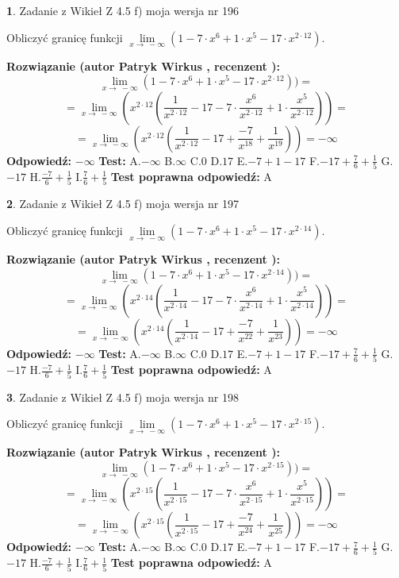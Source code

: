 \documentclass[12pt, a4paper]{article}
\theoremstyle{definition} %
\newtheorem{zad}{}
\newcommand{\zadStart}[1]{\begin{zad}#1\newline}
\newcommand{\zadStop}{\end{zad}}
\newcommand{\rozwStart}[2]{\noindent \textbf{Rozwiązanie (autor #1 , recenzent #2): }\newline}
\newcommand{\rozwStop}{\newline}
\newcommand{\odpStart}{\noindent \textbf{Odpowiedź:}\newline}
\newcommand{\odpStop}{\newline}
\newcommand{\testStart}{\noindent \textbf{Test:}\newline}
\newcommand{\testStop}{\newline}
\newcommand{\kluczStart}{\noindent \textbf{Test poprawna odpowiedź:}\newline}
\newcommand{\kluczStop}{\newline}
\begin{document}
\zadStart{Zadanie z Wikieł Z 4.5 f) moja wersja nr 196}



Obliczyć granicę funkcji  $\lim\limits_{x\to\ -\infty}(1 - 7 \cdot x^{6}+1 \cdot x^{5}- 17 \cdot x^{2\cdot12})$.
\zadStop
\rozwStart{Patryk Wirkus}{}
$$\lim\limits_{x\to\ -\infty}(1 - 7 \cdot x^{6}+1 \cdot x^{5}- 17 \cdot x^{2\cdot12}))=$$
$$=\lim\limits_{x\to\ -\infty}(x^{2\cdot12}(\frac{1}{x^{2\cdot12}}-17 -7 \cdot \frac{x^{6}}{x^{2\cdot12}}+1 \cdot \frac{x^{5}}{x^{2\cdot12}}))=$$
$$=\lim\limits_{x\to\ -\infty}(x^{2\cdot12}(\frac{1}{x^{2\cdot12}}-17 + \frac{-7}{x^{18}}+ \frac{1}{x^{19}}))=-\infty$$
\rozwStop
\odpStart
$-\infty$
\odpStop
\testStart
A.$-\infty$ B.$\infty$ C.$0$ D.$17$ E.$-7 + 1 - 17$
F.$-17+\frac{7}{6}+\frac{1}{5}$ G.$-17$
H.$\frac{-7}{6}+\frac{1}{5}$
I.$\frac{7}{6}+\frac{1}{5}$
\testStop
\kluczStart
A
\kluczStop



\zadStart{Zadanie z Wikieł Z 4.5 f) moja wersja nr 197}



Obliczyć granicę funkcji  $\lim\limits_{x\to\ -\infty}(1 - 7 \cdot x^{6}+1 \cdot x^{5}- 17 \cdot x^{2\cdot14})$.
\zadStop
\rozwStart{Patryk Wirkus}{}
$$\lim\limits_{x\to\ -\infty}(1 - 7 \cdot x^{6}+1 \cdot x^{5}- 17 \cdot x^{2\cdot14}))=$$
$$=\lim\limits_{x\to\ -\infty}(x^{2\cdot14}(\frac{1}{x^{2\cdot14}}-17 -7 \cdot \frac{x^{6}}{x^{2\cdot14}}+1 \cdot \frac{x^{5}}{x^{2\cdot14}}))=$$
$$=\lim\limits_{x\to\ -\infty}(x^{2\cdot14}(\frac{1}{x^{2\cdot14}}-17 + \frac{-7}{x^{22}}+ \frac{1}{x^{23}}))=-\infty$$
\rozwStop
\odpStart
$-\infty$
\odpStop
\testStart
A.$-\infty$ B.$\infty$ C.$0$ D.$17$ E.$-7 + 1 - 17$
F.$-17+\frac{7}{6}+\frac{1}{5}$ G.$-17$
H.$\frac{-7}{6}+\frac{1}{5}$
I.$\frac{7}{6}+\frac{1}{5}$
\testStop
\kluczStart
A
\kluczStop



\zadStart{Zadanie z Wikieł Z 4.5 f) moja wersja nr 198}



Obliczyć granicę funkcji  $\lim\limits_{x\to\ -\infty}(1 - 7 \cdot x^{6}+1 \cdot x^{5}- 17 \cdot x^{2\cdot15})$.
\zadStop
\rozwStart{Patryk Wirkus}{}
$$\lim\limits_{x\to\ -\infty}(1 - 7 \cdot x^{6}+1 \cdot x^{5}- 17 \cdot x^{2\cdot15}))=$$
$$=\lim\limits_{x\to\ -\infty}(x^{2\cdot15}(\frac{1}{x^{2\cdot15}}-17 -7 \cdot \frac{x^{6}}{x^{2\cdot15}}+1 \cdot \frac{x^{5}}{x^{2\cdot15}}))=$$
$$=\lim\limits_{x\to\ -\infty}(x^{2\cdot15}(\frac{1}{x^{2\cdot15}}-17 + \frac{-7}{x^{24}}+ \frac{1}{x^{25}}))=-\infty$$
\rozwStop
\odpStart
$-\infty$
\odpStop
\testStart
A.$-\infty$ B.$\infty$ C.$0$ D.$17$ E.$-7 + 1 - 17$
F.$-17+\frac{7}{6}+\frac{1}{5}$ G.$-17$
H.$\frac{-7}{6}+\frac{1}{5}$
I.$\frac{7}{6}+\frac{1}{5}$
\testStop
\kluczStart
A
\kluczStop
\end{document}
